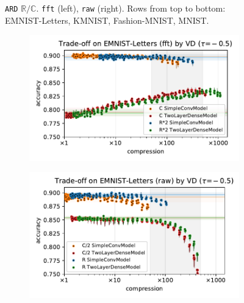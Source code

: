 \documentclass[a4paper,10pt,onecolumn]{article}
\newcommand{\real}{\mathbb{R}}
\newcommand{\cplx}{\mathbb{C}}
\begin{document}
\begin{figure}[b]
\begin{subfigure}[b]{0.5\columnwidth}
  \end{subfigure}
  \caption{%
    \texttt{ARD} $\real / \cplx$.
      \texttt{fft} (left), \texttt{raw} (right).
      Rows from top to bottom: EMNIST-Letters, KMNIST, Fashion-MNIST, MNIST.
  }
\end{figure}

\begin{figure}[b]
  \centering
  \begin{subfigure}[b]{0.5\columnwidth}
    \centering
    \includegraphics[width=\columnwidth]{figure__mnist-like__trade-off/appendix__cmp__VD__emnist_letters__fft__-0.5.pdf}
  \end{subfigure}%
  \begin{subfigure}[b]{0.5\columnwidth}
    \centering
    \includegraphics[width=\columnwidth]{figure__mnist-like__trade-off/appendix__cmp__VD__emnist_letters__raw__-0.5.pdf}
  \end{subfigure} \\%

\end{figure}
\end{document}
